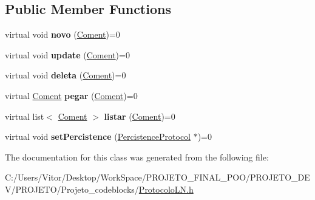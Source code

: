 \subsection*{Public Member Functions}
\begin{DoxyCompactItemize}
\item 
\hypertarget{class_coment_protocol_a96c2e0cb9eb4fdbf5a7eae853b6546df}{virtual void {\bfseries novo} (\hyperlink{class_coment}{Coment})=0}\label{class_coment_protocol_a96c2e0cb9eb4fdbf5a7eae853b6546df}

\item 
\hypertarget{class_coment_protocol_a5a1cc6af2c1a52b489e6897070e4183a}{virtual void {\bfseries update} (\hyperlink{class_coment}{Coment})=0}\label{class_coment_protocol_a5a1cc6af2c1a52b489e6897070e4183a}

\item 
\hypertarget{class_coment_protocol_a466292c4e836394ce7a46a9b86412cae}{virtual void {\bfseries deleta} (\hyperlink{class_coment}{Coment})=0}\label{class_coment_protocol_a466292c4e836394ce7a46a9b86412cae}

\item 
\hypertarget{class_coment_protocol_a3a1f008a4638d4d1505b416d7e866158}{virtual \hyperlink{class_coment}{Coment} {\bfseries pegar} (\hyperlink{class_coment}{Coment})=0}\label{class_coment_protocol_a3a1f008a4638d4d1505b416d7e866158}

\item 
\hypertarget{class_coment_protocol_af626d6d87a2586d33d8fdfbab674ea1a}{virtual list$<$ \hyperlink{class_coment}{Coment} $>$ {\bfseries listar} (\hyperlink{class_coment}{Coment})=0}\label{class_coment_protocol_af626d6d87a2586d33d8fdfbab674ea1a}

\item 
\hypertarget{class_coment_protocol_a282b789ce1d561b29a3eb68af1de7296}{virtual void {\bfseries set\-Percistence} (\hyperlink{class_percistence_protocol}{Percistence\-Protocol} $\ast$)=0}\label{class_coment_protocol_a282b789ce1d561b29a3eb68af1de7296}

\end{DoxyCompactItemize}


The documentation for this class was generated from the following file\-:\begin{DoxyCompactItemize}
\item 
C\-:/\-Users/\-Vitor/\-Desktop/\-Work\-Space/\-P\-R\-O\-J\-E\-T\-O\-\_\-\-F\-I\-N\-A\-L\-\_\-\-P\-O\-O/\-P\-R\-O\-J\-E\-T\-O\-\_\-\-D\-E\-V/\-P\-R\-O\-J\-E\-T\-O/\-Projeto\-\_\-codeblocks/\hyperlink{_protocolo_l_n_8h}{Protocolo\-L\-N.\-h}\end{DoxyCompactItemize}
